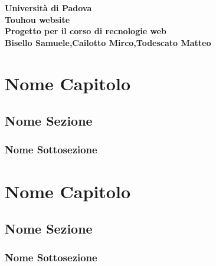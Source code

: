 \documentclass[openany, a4paper, 12pt]{report}
\begin{document}
	
	\begin{titlepage}
		\centering
		\vfill
		{
			\bfseries
			\vskip2cm
			\Large Università di Padova\\
			\vfill
			\Huge Touhou website\\
			\Large Progetto per il corso di recnologie web\\
			\vfill
			\large Bisello Samuele,Cailotto Mirco,Todescato Matteo\\
			\vfill
		}    
	\end{titlepage}
	\tableofcontents
	\newpage
	
	\chapter{Nome Capitolo}
	\section{Nome Sezione}
	\subsection{Nome Sottosezione}
	
	\chapter{Nome Capitolo}
	\section{Nome Sezione}
	\subsection{Nome Sottosezione}
\end{document}
